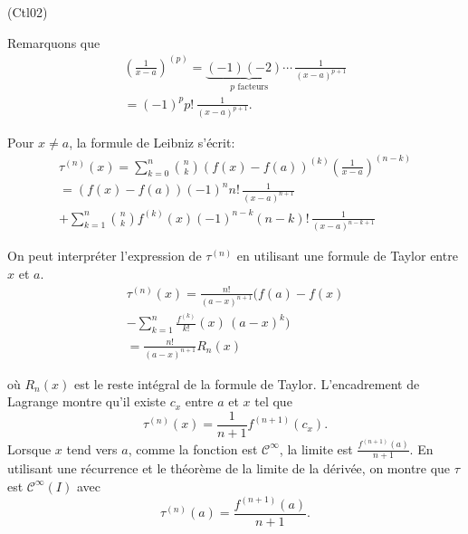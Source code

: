 \begin{tiny}(Ctl02)\end{tiny} Remarquons que
\begin{multline*}
  \left(\frac{1}{x-a}\right)^{(p)}
  = \underset{p \text{ facteurs}}{\underbrace{(-1)(-2)\cdots}}\,\frac{1}{(x-a)^{p+1}}\\
  = (-1)^p p!\,\frac{1}{(x-a)^{p+1}}.
\end{multline*}

Pour $x\neq a$, la formule de Leibniz s'écrit:
\begin{multline*}
  \tau^{(n)}(x)
= \sum_{k=0}^n \binom{n}{k}\left(f(x) - f(a)\right)^{(k)} \left(\frac{1}{x-a}\right)^{(n-k)}\\
= \left(f(x) - f(a)\right)(-1)^n n! \,\frac{1}{(x-a)^{n+1}}\\
+ \sum_{k=1}^n \binom{n}{k}f^{(k)}(x)(-1)^{n-k}(n-k)!\, \frac{1}{(x-a)^{n-k+1}}
\end{multline*}

On peut interpréter l'expression de $\tau^{(n)}$ en utilisant une formule de Taylor entre $x$ et $a$. 
\begin{multline*}
  \tau^{(n)}(x)
  = \frac{n!}{(a-x)^{n+1}}(f(a)-f(x) \\
  - \sum_{k=1}^n \frac{f^{(k)}}{k!}(x)\,(a-x)^{k})\\
  = \frac{n!}{(a-x)^{n+1}}R_n(x)
\end{multline*}

où $R_n(x)$ est le reste intégral de la formule de Taylor. L'encadrement de Lagrange montre qu'il existe $c_x$ entre $a$ et $x$ tel que
\[
 \tau^{(n)}(x) = \frac{1}{n+1}f^{(n+1)}(c_x).
\]
Lorsque $x$ tend vers $a$, comme la fonction est $\mathcal C^\infty$, la limite est $\frac{f^{(n+1)}(a)}{n+1}$. En utilisant une récurrence et le théorème de la limite de la dérivée, on  montre que $\tau$ est $\mathcal C^\infty(I)$ avec 
\[
  \tau^{(n)}(a) = \frac{f^{(n+1)}(a)}{n+1}.
\]
